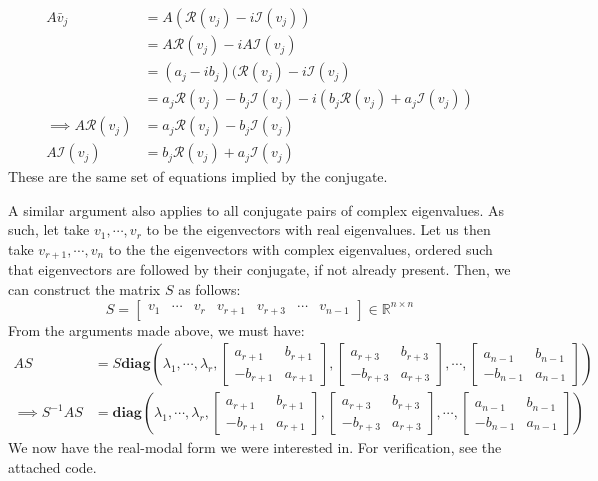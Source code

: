\documentclass[12pt]{exam}
\begin{document}
\begin{questions}
\begin{solution}
    \begin{align*}
      A\bar{v}_j &= A(\mathcal{R}(v_j) - i \mathcal{I}(v_j)) \\
      &= A\mathcal{R}(v_j) - i A \mathcal{I}(v_j) \\
      &= (a_j - ib_j)(\mathcal{R}(v_j) - i \mathcal{I}(v_j) \\
      &=  a_j\mathcal{R}(v_j) - b_j\mathcal{I}(v_j) - i(b_j\mathcal{R}(v_j) + a_j\mathcal{I}(v_j)) \\ 
    \implies A\mathcal{R}(v_j) &=  a_j\mathcal{R}(v_j) - b_j\mathcal{I}(v_j) \\
    A\mathcal{I}(v_j) &= b_j\mathcal{R}(v_j) + a_j\mathcal{I}(v_j)
    \end{align*}
    These are the same set of equations implied by the conjugate.
    
    A similar argument also applies to all conjugate pairs of complex eigenvalues. As such, let take $v_1, \cdots, v_r$ to be the eigenvectors with real eigenvalues. Let us then take $v_{r+1}, \cdots, v_n$ to the the eigenvectors with complex eigenvalues, ordered such that eigenvectors are followed by their conjugate, if not already present. Then, we can construct the matrix $S$ as follows:
    \[
      S = \begin{bmatrix} v_1 & \cdots &  v_r & v_{r+1} & v_{r+3} & \cdots & v_{n-1}\end{bmatrix} \in \mathbb{R}^{n \times n}
    \]
    From the arguments made above, we must have:
    \begin{align*}
      AS &= S\textbf{diag}\left(\lambda_1, \cdots, \lambda_r, \begin{bmatrix} a_{r+1} & b_{r+1} \\ -b_{r+1} & a_{r+1} \end{bmatrix},  \begin{bmatrix} a_{r+3} & b_{r+3} \\ -b_{r+3} & a_{r+3} \end{bmatrix}, \cdots,  \begin{bmatrix} a_{n-1} & b_{n-1} \\ -b_{n-1}  & a_{n-1} \end{bmatrix}\right) \\
      \implies S^{-1}AS &= \textbf{diag}\left(\lambda_1, \cdots, \lambda_r, \begin{bmatrix} a_{r+1} & b_{r+1} \\ -b_{r+1} & a_{r+1} \end{bmatrix},  \begin{bmatrix} a_{r+3} & b_{r+3} \\ -b_{r+3} & a_{r+3} \end{bmatrix}, \cdots,  \begin{bmatrix} a_{n-1} & b_{n-1} \\ -b_{n-1}  & a_{n-1} \end{bmatrix}\right)
    \end{align*}
    We now have the real-modal form we were interested in. For verification, see the attached code.


\end{solution}
\end{questions}
\end{document}
